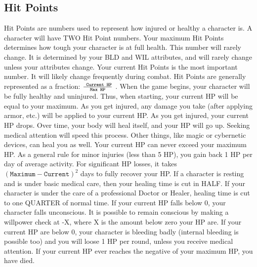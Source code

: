 \documentclass[twoside]{book}
\begin{document}
\subsection{Hit Points}
     Hit Points are numbers used to represent how injured
               or healthy a character is. A character will have TWO Hit
               Point numbers. Your maximum Hit Points determines how
               tough your character is at full health. This number will
               rarely change. It is determined by your BLD and WIL
               attributes, and will rarely change unless your attributes
               change.  Your current Hit Points is the most important number.
              It will likely change frequently during combat. Hit Points
              are generally represented as a fraction: \begin{math}{{\texttt{
              Current HP}}\over{\texttt{Max HP}}}\end{math} . When the
              game begins, your character will be fully healthy and
              uninjured. Thus, when starting, your current HP will be
              equal to your maximum.
             As you get injured, any damage you take (after
               applying armor, etc.) will be applied to your current HP.
               As you get injured, your current HP drops. Over time, your
               body will heal itself, and your HP will go up. Seeking
               medical attention will speed this process. Other things,
               like magic or cybernetic devices, can heal you as well.
                Your current HP can never exceed your maximum HP. As
               a general rule for minor injuries (less than 5 HP), you
               gain back 1 HP per day of average activity. For
               significant HP losses, it takes \begin{math}  
                    {   (   \texttt{Maximum} 
                      -   \texttt{Current}   )  
                     }^{ 2 }    \end{math}  days to fully recover your HP.
             If a character is resting and is under basic medical
               care, then your healing time is cut in HALF. If your
               character is under the care of a professional Doctor or
               Healer, healing time is cut to one QUARTER of normal time.
                If your current HP falls below 0, your character
               falls unconscious. It is possible to remain conscious by
               making a willpower check at -X, where X is the amount
               below zero your HP are. If your current HP are below 0,
               your character is bleeding badly (internal bleeding is
               possible too) and you will loose 1 HP per round, unless
               you receive medical attention. If your current HP ever
               reaches the negative of your maximum HP, you have died.
               
\end{document}
